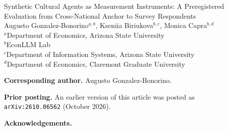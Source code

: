 \documentclass[12pt]{article}
\begin{document}
\thispagestyle{empty}
\begin{center}
{\Large Synthetic Cultural Agents as Measurement Instruments: A Preregistered Evaluation from Cross-National Anchor to Survey Respondents}\\[2em]
Augusto Gonzalez-Bonorino$^{a,b}$, Kseniia Biriukova$^{b,c}$, Monica Capra$^{b,d}$\\[1em]
{\small
$^a$Department of Economics, Arizona State University\\
$^b$EconLLM Lab\\
$^c$Department of Information Systems, Arizona State University\\
$^d$Department of Economics, Claremont Graduate University}
\end{center}

\vspace{2em}
\noindent\textbf{Corresponding author.} Augusto Gonzalez-Bonorino. %

\vspace{1em}
\noindent\textbf{Prior posting.} An earlier version of this article was posted as \texttt{arXiv:2610.06562} (October 2026). %

\vspace{1em}
\noindent\textbf{Acknowledgements.} %
\end{document}
